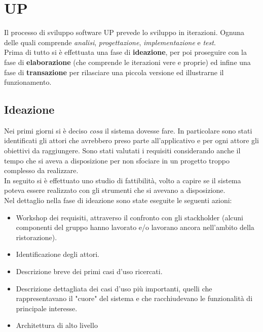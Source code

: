 \section{UP}
Il processo di sviluppo software UP prevede lo sviluppo in iterazioni. Ognuna delle quali comprende \textit{analisi}, \textit{progettazione}, \textit{implementazione} e \textit{test}.
\\Prima di tutto si è effettuata una fase di \textbf{ideazione}, per poi proseguire con la fase di \textbf{elaborazione} (che comprende le iterazioni vere e proprie) ed infine una fase di \textbf{transazione} per rilasciare una piccola versione ed illustrarne il funzionamento.

\subsection{Ideazione}
Nei primi giorni si è deciso \textit{cosa} il sistema dovesse fare. In particolare sono stati identificati gli attori che avrebbero preso parte all'applicativo e per ogni attore gli obiettivi da raggiungere. Sono stati valutati i requisiti considerando anche il tempo che si aveva a disposizione per non sfociare in un progetto troppo complesso da realizzare.
\\In seguito si è effettuato uno studio di fattibilità, volto a capire se il sistema poteva essere realizzato con gli strumenti che si avevano a disposizione. 
\\Nel dettaglio nella fase di ideazione sono state eseguite le seguenti azioni:
\begin{itemize}
	\item Workshop dei requisiti, attraverso il confronto con gli stackholder (alcuni componenti del gruppo hanno lavorato e/o lavorano ancora nell'ambito della ristorazione).
	\item Identificazione degli attori.
	\item Descrizione breve dei primi casi d'uso ricercati.
	\item Descrizione dettagliata dei casi d'uso più importanti, quelli che rappresentavano il "cuore" del sistema e che racchiudevano le funzionalità di principale interesse.
	\item Architettura di alto livello 	
\end{itemize} 

